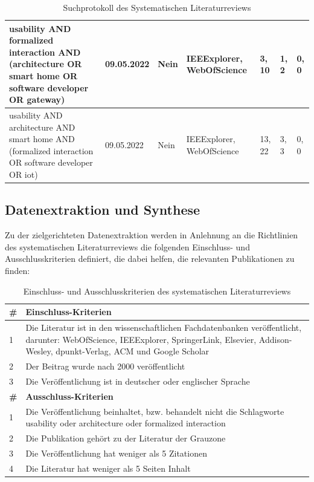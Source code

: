\begin{table}[hbt!]
\begin{center}
\begin{tabular}{| p{2.9cm} | p{1.9cm} | p{1.6cm} | p{1.9cm} | p{1.9cm} | p{1.8cm} | p{1.8cm} | }
                    \hline
                        usability AND formalized interaction AND (architecture OR smart home OR software developer OR gateway) & 09.05.2022 & Nein & IEEExplorer, WebOfScience & 3, 10 & 1, 2 & 0, 0 \\
                    \hline
                        usability AND architecture AND smart home AND (formalized interaction OR software developer OR iot) & 09.05.2022 & Nein & IEEExplorer, WebOfScience & 13, 22 & 3, 3 & 0, 0 \\
                    \hline
                \end{tabular}
            \end{center}
            \caption{Suchprotokoll des Systematischen Literaturreviews}
            \label{tab:slr}
        \end{table}
    \subsection{Datenextraktion und Synthese}
        Zu der zielgerichteten Datenextraktion werden in Anlehnung an die Richtlinien des systematischen Literaturreviews die folgenden 
        Einschluss- und Ausschlusskriterien definiert, die dabei helfen, die relevanten Publikationen zu finden:
        \begin{table}[hbt!]
            \centering
            \begin{tabular}{p{0.125cm} p{15cm}}
                    \textbf{\#} & \textbf{Einschluss-Kriterien}\\ 
                \hline
                    1  & Die Literatur ist in den wissenschaftlichen Fachdatenbanken veröffentlicht, darunter: WebOfScience, IEEExplorer, SpringerLink, Elsevier, Addison-Wesley, dpunkt-Verlag, ACM und Google Scholar  \\ 
                \hline
                    2  & Der Beitrag wurde nach 2000 veröffentlicht \\ 
                \hline
                    3  & Die Veröffentlichung ist in deutscher oder englischer Sprache \\
                \hline
                    \textbf{\#} & \textbf{Ausschluss-Kriterien}\\ 
                \hline
                    1  & Die Veröffentlichung beinhaltet, bzw. behandelt nicht die Schlagworte usability oder architecture oder formalized interaction  \\ 
                \hline
                    2  & Die Publikation gehört zu der Literatur der Grauzone \\ 
                \hline
                    3  & Die Veröffentlichung hat weniger als 5 Zitationen \\
                \hline
                    4  & Die Literatur hat weniger als 5 Seiten Inhalt \\
            \end{tabular}
            \caption{Einschluss- und Ausschlusskriterien des systematischen Literaturreviews}
            \label{tab:slr_criteria}
        \end{table}
